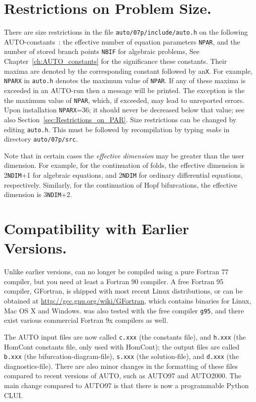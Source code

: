 \documentclass[12pt]{report}
\begin{document}
\section{ Restrictions on Problem Size.} \label{sec:Restrictions}
There are size restrictions in the file {\tt auto/07p/include/auto.h}
on the following {\cal AUTO}-constants~:
the effective number of equation parameters {\tt NPAR}, and
the number of stored branch points {\tt NBIF} for algebraic problems,
See Chapter~\ref{ch:AUTO_constants} 
for the significance these constants. 
Their maxima are denoted by the  corresponding constant followed by an{\tt X}.
For example, {\tt NPARX} in {\tt auto.h} denotes the maximum value 
of {\tt NPAR}.
If any of these maxima is exceeded in an {\cal AUTO}-run then a message 
will be printed.
The exception is the the maximum value of {\tt NPAR},
which, if exceeded, may lead to unreported errors.
Upon installation {\tt NPARX}=36; it should never be decreased below that value;
see also Section~\ref{sec:Restrictions_on_PAR}.
Size restrictions can be changed by editing {\tt auto.h}.
This must be followed by recompilation by typing {\it make} 
in directory {\tt auto/07p/src}.

Note that in certain cases the {\it effective dimension} may be greater
than the user dimension.
For example, for the continuation of folds,
the effective dimension is 2{\tt NDIM}+1 for algebraic equations,
and 2{\tt NDIM} for ordinary differential equations, respectively.
Similarly, for the continuation of Hopf bifurcations,
the effective dimension is 3{\tt NDIM}+2.
 
 
\section{Compatibility with Earlier Versions.} \label{sec:Compatibility}
Unlike earlier versions, \AUTO can no longer be compiled using a pure
Fortran 77 compiler, but you need at least a Fortran 90 compiler.
A free Fortran 95 compiler, GFortran, is shipped with most recent
Linux distributions, or can be obtained at
\url{http://gcc.gnu.org/wiki/GFortran}, which contains binaries for
Linux, Mac OS X and Windows. \AUTO was also tested with the free
compiler {\tt g95}, and there exist various commercial Fortran
9x compilers as well.

The {\cal AUTO} input files are now called 
{\tt c.xxx} (the constants file),
and
{\tt h.xxx} (the {\cal HomCont} constants file, only used with {\cal HomCont});
the output files are called
{\tt b.xxx} (the bifurcation-diagram-file),
{\tt s.xxx} (the solution-file),
and
{\tt d.xxx} (the diagnostics-file).
There are also minor changes in the formatting of these files 
compared to recent versions of {\cal AUTO}, such as {\cal AUTO97} 
and {\cal AUTO2000}.
The main change compared to {\cal AUTO97} is that there is now a
programmable Python CLUI.
\end{document}
